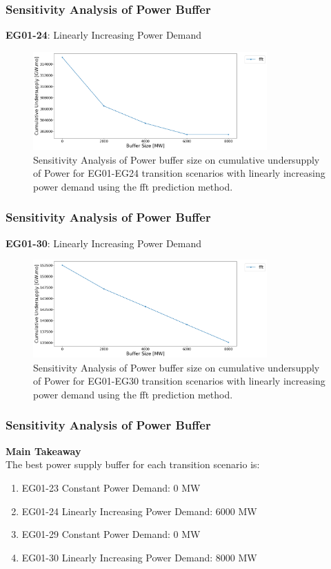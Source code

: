 \begin{frame}
    \frametitle{Sensitivity Analysis of Power Buffer}
    \textbf{EG01-24}: Linearly Increasing Power Demand
    \begin{figure}[htbp!]
        \begin{center}
          \includegraphics[width=0.8\textwidth]{images/24-sens-buffer}
        \end{center}
              \caption{Sensitivity Analysis of Power buffer size on cumulative 
              undersupply of Power for EG01-EG24 transition scenarios 
              with linearly increasing power demand using the fft prediction method.}
      \end{figure}
\end{frame}

\begin{frame}
    \frametitle{Sensitivity Analysis of Power Buffer}
    \textbf{EG01-30}: Linearly Increasing Power Demand
    \begin{figure}[htbp!]
        \begin{center}
          \includegraphics[width=0.8\textwidth]{images/30-sens-buffer}
        \end{center}
              \caption{Sensitivity Analysis of Power buffer size on cumulative 
              undersupply of Power for EG01-EG30 transition scenarios 
              with linearly increasing power demand using the fft prediction method.}
      \end{figure}
\end{frame}

\begin{frame}
  \frametitle{Sensitivity Analysis of Power Buffer}
  \textbf{Main Takeaway}
  \\
  The best power supply buffer for each transition scenario is: 
  \begin{enumerate}
    \item EG01-23 Constant Power Demand: 0 MW
    \item EG01-24 Linearly Increasing Power Demand: 6000 MW
    \item EG01-29 Constant Power Demand: 0 MW
    \item EG01-30 Linearly Increasing Power Demand: 8000 MW 
\end{enumerate}
\end{frame}
